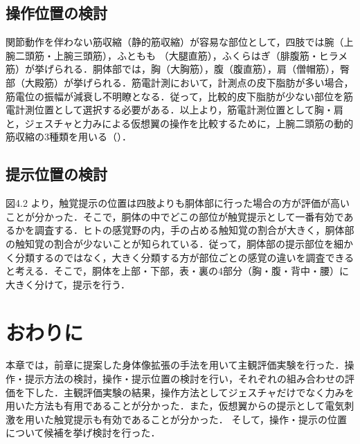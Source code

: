     \subsection{操作位置の検討}
        
        関節動作を伴わない筋収縮（静的筋収縮）が容易な部位として，四肢では腕（上腕二頭筋・上腕三頭筋），ふともも
        （大腿直筋），ふくらはぎ（腓腹筋・ヒラメ筋）が挙げられる．胴体部では，胸（大胸筋），腹（腹直筋），肩（僧帽筋），臀部（大殿筋）が挙げられる．筋電計測において，計測点の皮下脂肪が多い場合，筋電位の振幅が減衰し不明瞭となる\cite{白石恵1992筋電位多点計測による体幹背部の神経支配帯の分布}．従って，比較的皮下脂肪が少ない部位を筋電計測位置として選択する必要がある．以上より，筋電計測位置として胸・肩と，ジェスチャと力みによる仮想翼の操作を比較するために，上腕二頭筋の動的筋収縮の3種類を用いる（）．

    \subsection{提示位置の検討}
        図4.2
        より，触覚提示の位置は四肢よりも胴体部に行った場合の方が評価が高いことが分かった．そこで，胴体の中でどこの部位が触覚提示として一番有効であるかを調査する．ヒトの感覚野の内，手の占める触知覚の割合が大きく\cite{penfield1950cerebral}，胴体部の触知覚の割合が少ない\cite{gibson1962observations}\cite{丸本耕次1997触覚表示の認知特性に関する研究}\cite{杉輝夫2005身体部位による触知覚の差}ことが知られている．従って，胴体部の提示部位を細かく分類するのではなく，大きく分類する方が部位ごとの感覚の違いを調査できると考える．そこで，胴体を上部・下部，表・裏の4部分（胸・腹・背中・腰）に大きく分けて，提示を行う．        

\section{おわりに}
    本章では，前章に提案した身体像拡張の手法を用いて主観評価実験を行った．操作・提示方法の検討，操作・提示位置の検討を行い，それぞれの組み合わせの評価を下した．主観評価実験の結果，操作方法としてジェスチャだけでなく力みを用いた方法も有用であることが分かった．また，仮想翼からの提示として電気刺激を用いた触覚提示も有効であることが分かった．
    そして，操作・提示の位置について候補を挙げ検討を行った．